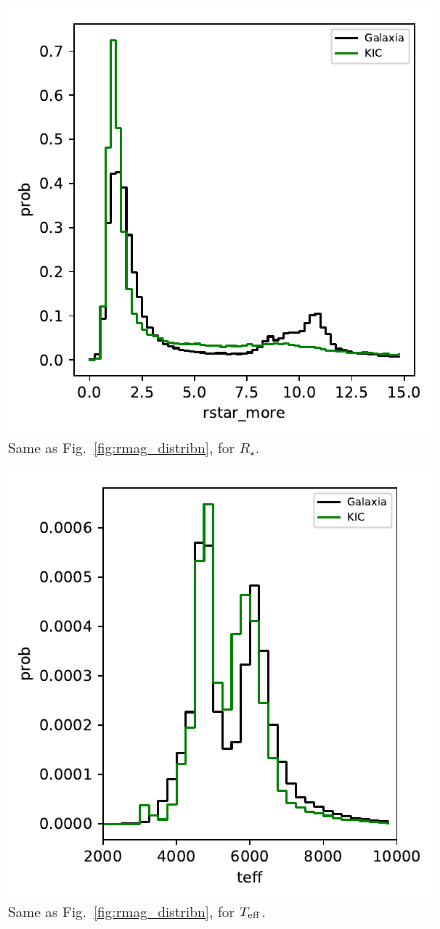 \documentclass{emulateapj}
\begin{document}
\begin{figure}[!t]
	\begin{center}
		\includegraphics[scale=.8]{figures/rstar_more_distribn.pdf}
	\end{center}
	\caption{Same as Fig.~\ref{fig:rmag_distribn}, for $R_\star$.}
	\label{fig:rstar_more_distribn}
\end{figure}
\begin{figure}[!t]
	\begin{center}
		\includegraphics[scale=.8]{figures/teff_distribn.pdf}
	\end{center}
	\caption{Same as Fig.~\ref{fig:rmag_distribn}, for $T_{\rm eff}$.}
	\label{fig:teff_distribn}
\end{figure}
\end{document}
